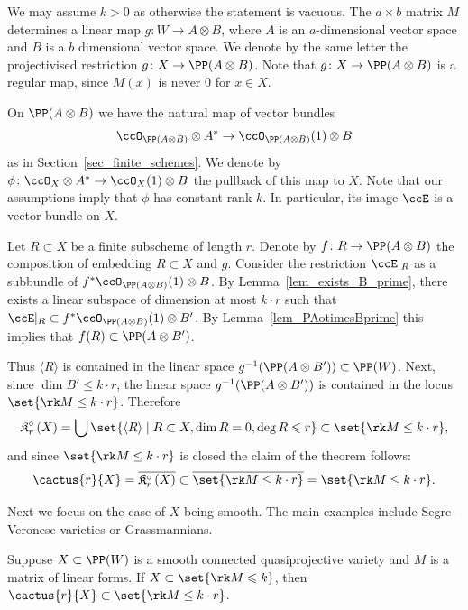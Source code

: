 \documentclass[12pt,a4paper]{article}
\newcommand{\cactusop}[2]{\mathfrak{K}^{\circ}_{#1}\left( #2 \right)}
\begin{document}
\begin{prf}
   We may assume $k>0$ as otherwise the statement is vacuous.
   The $a \times b$ matrix $M$ determines a linear map $g\colon W \to A\otimes B$,
     where $A$ is an $a$-dimensional vector space and $B$ is a $b$ dimensional vector space.
   We denote by the same letter the projectivised restriction $g\colon X \to \PP (A\otimes B)$.
   Note that $g\colon X \to \PP (A\otimes B)$ is a regular map, since $M(x)$ is never $0$ for $x\in X$.

   On $\PP(A\otimes B)$ we have the natural map of vector bundles
   \[
     \ccO_{\PP (A\otimes B)} \otimes A^* \to \ccO_{\PP (A\otimes B)}(1) \otimes B
   \]
   as in Section~\ref{sec_finite_schemes}.
   We denote by $\phi\colon \ccO_{X} \otimes A^* \to \ccO_{X}(1) \otimes B$ the pullback of this map to $X$.
   Note that our assumptions imply that $\phi$ has constant rank $k$.
   In particular, its image $\ccE$ is a vector bundle on $X$.

   Let $R \subset X$ be a finite subscheme of length $r$.
   Denote by $f\colon R \to \PP(A\otimes B)$ the composition of embedding $R \subset X$ and $g$.
   Consider the restriction $\ccE|_{R}$ as a subbundle of $ f^*\ccO_{\PP (A\otimes B)}(1) \otimes B$.
   By Lemma~\ref{lem_exists_B_prime}, there exists a linear subspace of dimension at most $k \cdot r$
      such that $\ccE|_{R} \subset f^*\ccO_{\PP (A\otimes B)}(1) \otimes B'$.
   By Lemma~\ref{lem_PAotimesBprime} this implies that $f (R)\subset \PP(A\otimes B')$.

   Thus $\langle R \rangle$ is contained in the linear space $g^{-1} (\PP(A\otimes B')) \subset \PP(W)$.
   Next, since $\dim B'\le k\cdot r$, the linear space $g^{-1} (\PP(A\otimes B'))$ is contained in the locus  $\set{\rk M\le k \cdot r}$.
   Therefore
   \[
    \cactusop{r}{X} = \bigcup \set{\langle R \rangle \mid
     R\subset X, \dim R = 0, \deg R \leqslant r}
     \subset \set{\rk M\le k \cdot r},
   \]
      and since $\set{\rk M\le k \cdot r}$
      is closed the claim of the theorem follows:
   \[
      \cactus{r}{X} = \overline{\cactusop{r}{X}} \subset
      \overline{\set{\rk M\le k \cdot r}} =\set{\rk M\le k \cdot r}.
   \]
\end{prf}

Next we focus on the case of $X$ being smooth.
The main examples include Segre-Veronese varieties or Grassmannians.

\begin{thm}
   \label{thm_determinantal_cacti_for_smooth}
   Suppose $X\subset \PP(W)$ is a smooth connected quasiprojective variety and $M$ is a matrix of linear forms.
   If $X\subset \set{\rk M \leqslant k}$,
   then $\cactus{r}{X} \subset \set{\rk M \le k \cdot r}$.
\end{thm}
\end{document}
